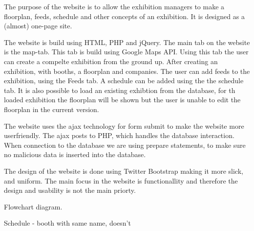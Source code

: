 The purpose of the website is to allow the exhibition managers to make a floorplan, feeds, schedule and other concepts of an exhibition.
It is designed as a (almost) one-page site. 

The website is build using HTML, PHP and jQuery. The main tab on the website is the map-tab. This tab is build using Google Maps API. Using this tab the user can create a compelte exhibition from the ground up.
After creating an exhibition, with booths, a floorplan and companies. The user can add feeds to the exhibition, using the Feeds tab. A schedule can be added using the the schedule tab.
It is also possible to load an existing exhibtion from the database, for th loaded exhibition the floorplan will be shown but the user is unable to edit the floorplan in the current version.

The website uses the ajax technology for form submit to make the website more userfriendly. The ajax posts to PHP, which handles the database interaction. When connection to the database we are using prepare statements, to make sure no malicious data is inserted into the database.

The design of the website is done using Twitter Bootstrap making it more slick, and uniform.
The main focus in the website is functionallity and therefore the design and usability is not the main priorty.




Flowchart diagram.


Schedule - booth with same name, doesn't 